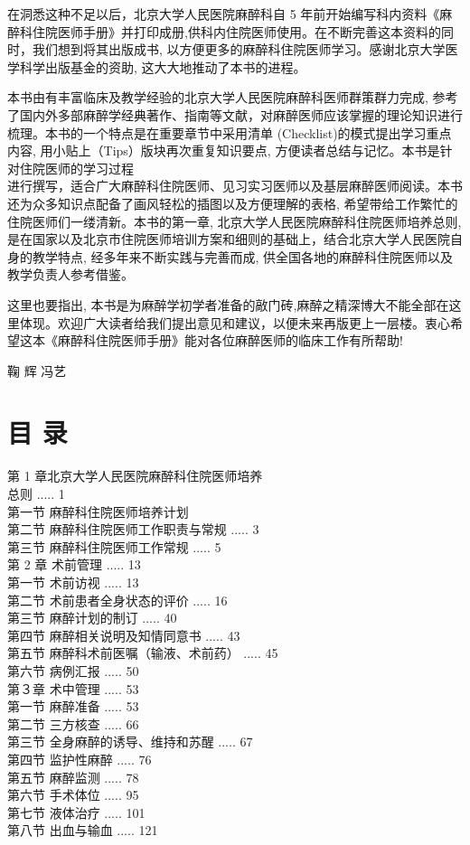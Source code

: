 \documentclass[10pt]{article}
\begin{document}
在洞悉这种不足以后，北京大学人民医院麻醉科自 5 年前开始编写科内资料《麻醉科住院医师手册》并打印成册,供科内住院医师使用。在不断完善这本资料的同时，我们想到将其出版成书, 以方便更多的麻醉科住院医师学习。感谢北京大学医学科学出版基金的资助, 这大大地推动了本书的进程。

本书由有丰富临床及教学经验的北京大学人民医院麻醉科医师群策群力完成, 参考了国内外多部麻醉学经典著作、指南等文献，对麻醉医师应该掌握的理论知识进行梳理。本书的一个特点是在重要章节中采用清单 (Checklist)的模式提出学习重点内容, 用小贴上（Tips）版块再次重复知识要点, 方便读者总结与记忆。本书是针对住院医师的学习过程\\
进行撰写，适合广大麻醉科住院医师、见习实习医师以及基层麻醉医师阅读。本书还为众多知识点配备了画风轻松的插图以及方便理解的表格, 希望带给工作繁忙的住院医师们一缕清新。本书的第一章, 北京大学人民医院麻醉科住院医师培养总则, 是在国家以及北京市住院医师培训方案和细则的基础上，结合北京大学人民医院自身的教学特点, 经多年来不断实践与完善而成, 供全国各地的麻醉科住院医师以及教学负责人参考借鉴。

这里也要指出, 本书是为麻醉学初学者准备的㪣门砖,麻醉之精深博大不能全部在这里体现。欢迎广大读者给我们提出意见和建议，以便未来再版更上一层楼。衷心希望这本《麻醉科住院医师手册》能对各位麻醉医师的临床工作有所帮助!

鞠 辉 冯艺

\section*{目 录}
第 1 章北京大学人民医院麻醉科住院医师培养\\
总则 ..... 1\\
第一节 麻醉科住院医师培养计划\\
第二节 麻醉科住院医师工作职责与常规 ..... 3\\
第三节 麻醉科住院医师工作常规 ..... 5\\
第 2 章 术前管理 ..... 13\\
第一节 术前访视 ..... 13\\
第二节 术前患者全身状态的评价 ..... 16\\
第三节 麻醉计划的制订 ..... 40\\
第四节 麻醉相关说明及知情同意书 ..... 43\\
第五节 麻醉科术前医嘱（输液、术前药） ..... 45\\
第六节 病例汇报 ..... 50\\
第３章 术中管理 ..... 53\\
第一节 麻醉准备 ..... 53\\
第二节 三方核查 ..... 66\\
第三节 全身麻醉的诱导、维持和苏醒 ..... 67\\
第四节 监护性麻醉 ..... 76\\
第五节 麻醉监测 ..... 78\\
第六节 手术体位 ..... 95\\
第七节 液体治疗 ..... 101\\
第八节 出血与输血 ..... 121
\end{document}
